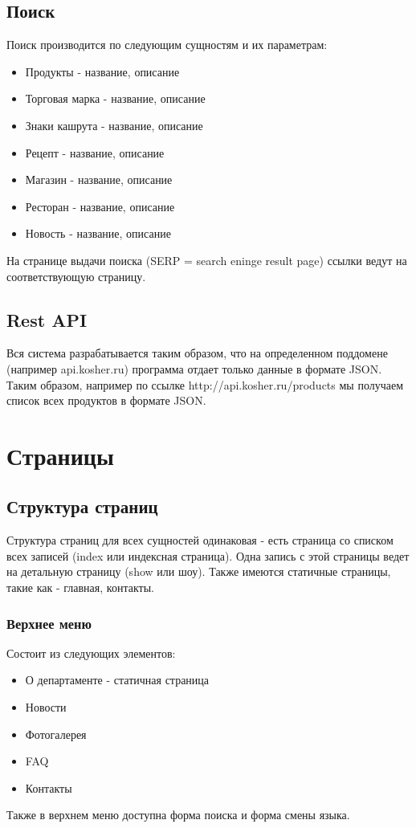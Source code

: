 \documentclass[DIV=calc, paper=a4, fontsize=11pt]{scrartcl} %
\begin{document}
\subsection{Поиск}
Поиск производится по следующим сущностям и их параметрам:
\begin{itemize}
	\item Продукты - название, описание
	\item Торговая марка - название, описание 
	\item Знаки кашрута - название, описание
	\item Рецепт - название, описание
	\item Магазин - название, описание
	\item Ресторан - название, описание
	\item Новость - название, описание
\end{itemize}
На странице выдачи поиска (SERP = search eninge result page) ссылки ведут на соответствующую страницу.

\subsection{Rest API}
Вся система разрабатывается таким образом, что на определенном поддомене (например api.kosher.ru) программа отдает только данные в формате JSON. Таким образом, например по ссылке http://api.kosher.ru/products мы получаем список всех продуктов в формате JSON.

\section{Страницы}

\subsection{Структура страниц}
Структура страниц для всех сущностей одинаковая - есть страница со списком всех записей (index или индексная страница). Одна запись с этой страницы ведет на детальную страницу (show или шоу). Также имеются статичные страницы, такие как - главная, контакты.

\subsubsection{Верхнее меню}


Состоит из следующих элементов:
\begin{itemize}
	\item О департаменте - статичная страница
	\item Новости
	\item Фотогалерея
	\item FAQ
	\item Контакты
\end{itemize}
Также в верхнем меню доступна форма поиска и форма смены языка.
\end{document}
